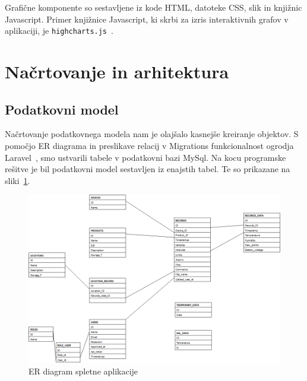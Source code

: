 \documentclass[a4paper, 12pt]{book}
\begin{document}
Grafične komponente so sestavljene iz kode HTML, datoteke CSS, slik in knjižnic Javascript.
Primer knjižnice Javascript, ki skrbi za izris interaktivnih grafov v aplikaciji, je {\tt highcharts.js}~\cite{hightchars-js}.




\section{Načrtovanje in arhitektura}

\subsection{Podatkovni model}

Načrtovanje podatkovnega modela nam je olajšalo kasnejše kreiranje objektov. S pomočjo ER diagrama in preslikave relacij v Migrations funkcionalnost ogrodja Laravel~\cite{laravel-migrations}, smo ustvarili tabele v podatkovni bazi MySql. Na kocu programske rešitve je bil podatkovni model sestavljen iz enajstih tabel. Te so prikazane na sliki~\ref{database-model}.

\begin{figure}[t]
\begin{center}
\includegraphics[width=\textwidth]{slike/database_model-updated-for-diploma-1.png}
\end{center}
\caption{ER diagram spletne aplikacije}
\label{database-model}
\end{figure}
\end{document}
